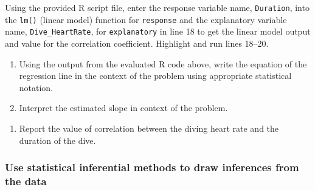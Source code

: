 \documentclass[
]{report}
\newenvironment{Shaded}{\begin{snugshade}}{\end{snugshade}}
\newcommand{\AttributeTok}[1]{\textcolor[rgb]{0.77,0.63,0.00}{#1}}
\newcommand{\CommentTok}[1]{\textcolor[rgb]{0.56,0.35,0.01}{\textit{#1}}}
\newcommand{\DecValTok}[1]{\textcolor[rgb]{0.00,0.00,0.81}{#1}}
\newcommand{\FunctionTok}[1]{\textcolor[rgb]{0.00,0.00,0.00}{#1}}
\newcommand{\NormalTok}[1]{#1}
\newcommand{\OtherTok}[1]{\textcolor[rgb]{0.56,0.35,0.01}{#1}}
\newcommand{\SpecialCharTok}[1]{\textcolor[rgb]{0.00,0.00,0.00}{#1}}
\providecommand{\tightlist}{%
  \setlength{\itemsep}{0pt}\setlength{\parskip}{0pt}}
\begin{document}
Using the provided R script file, enter the response variable name, \texttt{Duration}, into the \texttt{lm()} (linear model) function for \texttt{response} and the explanatory variable name, \texttt{Dive\_HeartRate}, for \texttt{explanatory} in line 18 to get the linear model output and value for the correlation coefficient. Highlight and run lines 18--20.

\begin{Shaded}
\end{Shaded}

\begin{enumerate}
\def\labelenumi{\arabic{enumi}.}
\setcounter{enumi}{5}
\item
  Using the output from the evaluated R code above, write the equation of the regression line in the context of the problem using appropriate statistical notation.
  \vspace{1in}
\item
  Interpret the estimated slope in context of the problem.
\end{enumerate}

\vspace{1in}

\begin{enumerate}
\def\labelenumi{\arabic{enumi}.}
\setcounter{enumi}{7}
\tightlist
\item
  Report the value of correlation between the diving heart rate and the duration of the dive.
\end{enumerate}

\vspace{0.3in}

\hypertarget{use-statistical-inferential-methods-to-draw-inferences-from-the-data-5}{%
\subsubsection*{Use statistical inferential methods to draw inferences from the data}\label{use-statistical-inferential-methods-to-draw-inferences-from-the-data-5}}
\end{document}
